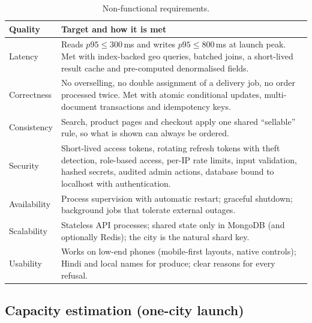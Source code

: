 \documentclass[11pt,a4paper]{article}
\begin{document}
\begin{table}[H]\centering\small
\begin{tabularx}{\linewidth}{@{}p{3.2cm}L@{}}
\toprule
\textbf{Quality} & \textbf{Target and how it is met} \\
\midrule
Latency & Reads $p95 \le 300$\,ms and writes $p95 \le 800$\,ms at launch peak. Met with index-backed geo queries, batched joins, a short-lived result cache and pre-computed denormalised fields. \\
Correctness & No overselling, no double assignment of a delivery job, no order processed twice. Met with atomic conditional updates, multi-document transactions and idempotency keys. \\
Consistency & Search, product pages and checkout apply one shared ``sellable'' rule, so what is shown can always be ordered. \\
Security & Short-lived access tokens, rotating refresh tokens with theft detection, role-based access, per-IP rate limits, input validation, hashed secrets, audited admin actions, database bound to localhost with authentication. \\
Availability & Process supervision with automatic restart; graceful shutdown; background jobs that tolerate external outages. \\
Scalability & Stateless API processes; shared state only in MongoDB (and optionally Redis); the city is the natural shard key. \\
Usability & Works on low-end phones (mobile-first layouts, native controls); Hindi and local names for produce; clear reasons for every refusal. \\
\bottomrule
\end{tabularx}
\caption{Non-functional requirements.}
\end{table}

\subsection{Capacity estimation (one-city launch)}
\end{document}
